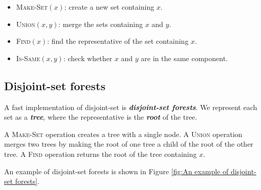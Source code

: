 \documentclass[12pt,a4paper]{ctexart}
\newcommand{\highlight}[1]{\textbf{\textit{#1}}}
\begin{document}
    \begin{itemize}
        \item \textsc{Make-Set}$(x)$: create a new set containing $x$.
        \item \textsc{Union}$(x,y)$: merge the sets containing $x$ and $y$.
        \item \textsc{Find}$(x)$: find the representative of the set containing $x$.
        \item \textsc{Is-Same}$(x,y)$: check whether $x$ and $y$ are in the same component.
    \end{itemize}

    \subsection{Disjoint-set forests}

    A fast implementation of disjoint-set is \highlight{disjoint-set forests}. We represent each set as a \highlight{tree}, where the representative is the \highlight{root} of the tree.

    A \textsc{Make-Set} operation creates a tree with a single node. A \textsc{Union} operation merges two trees by making the root of one tree a child of the root of the other tree. A \textsc{Find} operation returns the root of the tree containing $x$.

    An example of disjoint-set forests is shown in Figure \ref{fig:An example of disjoint-set forests}.
\end{document}
